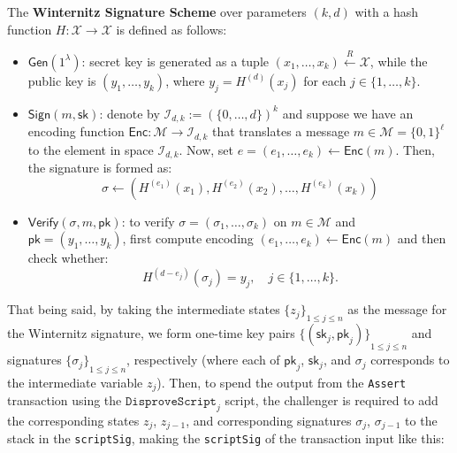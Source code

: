 \documentclass{iacrtrans}
\begin{document}
\begin{definition}
  The \textbf{Winternitz Signature Scheme} over parameters $(k,d)$
  with a hash function $H: \mathcal{X} \to \mathcal{X}$ is defined as follows:
  \begin{itemize}
    \item $\mathsf{Gen}(1^{\lambda})$: secret key is generated as a tuple
      $(x_1,\dots,x_k) \xleftarrow{R} \mathcal{X}$, while the public key is
      $(y_1,\dots,y_k)$, where $y_j = H^{(d)}(x_j)$ for each
      $j \in \{1,\dots,k\}$.
    \item $\mathsf{Sign}(m,\mathsf{sk})$: denote by
      $\mathcal{I}_{d,k} := {(\{0,\dots,d\})}^k$ and suppose we have an encoding
      function $\mathsf{Enc}: \mathcal{M} \to \mathcal{I}_{d,k}$ that
      translates a message
      $m \in \mathcal{M} = {\{0,1\}}^{\ell}$ to the element in space
      $\mathcal{I}_{d,k}$. Now, set
      $e = (e_1,\dots,e_k) \gets \mathsf{Enc}(m)$. Then, the signature is
      formed as:
      \begin{equation*}
        \sigma \gets ({H}^{(e_1)}(x_1), H^{(e_2)}(x_2), \dots, H^{(e_k)}(x_k))
      \end{equation*}
    \item $\mathsf{Verify}(\sigma,m,\mathsf{pk})$: to verify
      $\sigma = (\sigma_1,\dots,\sigma_k)$ on $m \in \mathcal{M}$ and
      $\mathsf{pk}=(y_1,\dots,y_k)$, first compute encoding
      $(e_1,\dots,e_k) \gets \mathsf{Enc}(m)$ and then check whether:
      \begin{equation*}
        H^{(d-e_j)}(\sigma_j) = y_j, \quad j \in \{1,\dots,k\}.
      \end{equation*}
  \end{itemize}
\end{definition}

That being said, by taking the intermediate states
${\{z_j\}}_{1 \leq j \leq n}$ as the message for the Winternitz signature, we
form one-time key pairs
${\{(\mathsf{sk}_j,\mathsf{pk}_j)\}}_{1 \leq j \leq n}$ and signatures
${\{\sigma_j\}}_{1 \leq j \leq n}$, respectively (where each of
  $\mathsf{pk}_j$, $\mathsf{sk}_j$, and $\sigma_j$ corresponds to the
intermediate variable $z_j$). Then, to spend the output from the
\texttt{Assert} transaction using the $\texttt{DisproveScript}_j$
script, the challenger is required to add the corresponding states
$z_j$, $z_{j-1}$, and corresponding signatures $\sigma_j$,
$\sigma_{j-1}$ to the stack in the \texttt{scriptSig}, making the
\texttt{scriptSig} of the transaction input like this:
\end{document}
